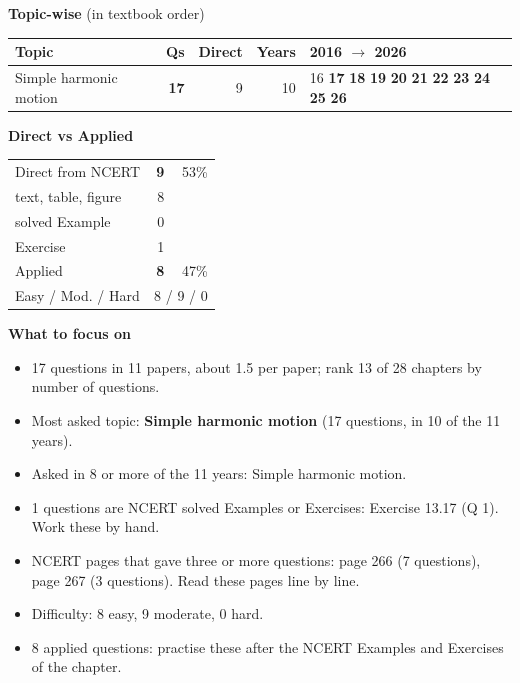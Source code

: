 {\small\textbf{\color{crimson}Topic-wise} (in textbook order)\par\smallskip
\begin{tabularx}{\linewidth}{@{}>{\raggedright\arraybackslash}Xrrrl@{}}\toprule
Topic & Qs & Direct & Years & 2016 $\rightarrow$ 2026\\\midrule
Simple harmonic motion & \textbf{17} & 9 & 10 & {\scriptsize {\color{gray!45}16} \textbf{17} \textbf{18} \textbf{19} \textbf{20} \textbf{21} \textbf{22} \textbf{23} \textbf{24} \textbf{25} \textbf{26}}\\
\bottomrule\end{tabularx}}\par\medskip
\begin{minipage}[t]{0.34\linewidth}{\small\textbf{\color{crimson}Direct vs Applied}\par\smallskip
\begin{tabular}{@{}lrr@{}}\toprule
Direct from NCERT & \textbf{9} & 53\%\\
\quad text, table, figure & 8 &\\
\quad solved Example & 0 &\\
\quad Exercise & 1 &\\
Applied & \textbf{8} & 47\%\\\midrule
Easy / Mod. / Hard & \multicolumn{2}{r}{8 / 9 / 0}\\\bottomrule
\end{tabular}}\end{minipage}\hfill
\begin{minipage}[t]{0.63\linewidth}{\small\textbf{\color{crimson}What to focus on}\par\smallskip
\begin{itemize}[leftmargin=1.1em,itemsep=1pt,topsep=0pt]
\item 17 questions in 11 papers, about 1.5 per paper; rank 13 of 28 chapters by number of questions.
\item Most asked topic: \textbf{Simple harmonic motion} (17 questions, in 10 of the 11 years).
\item Asked in 8 or more of the 11 years: Simple harmonic motion.
\item 1 questions are NCERT solved Examples or Exercises: Exercise 13.17 (Q 1). Work these by hand.
\item NCERT pages that gave three or more questions: page 266 (7 questions), page 267 (3 questions). Read these pages line by line.
\item Difficulty: 8 easy, 9 moderate, 0 hard.
\item 8 applied questions: practise these after the NCERT Examples and Exercises of the chapter.
\end{itemize}}\end{minipage}\par
